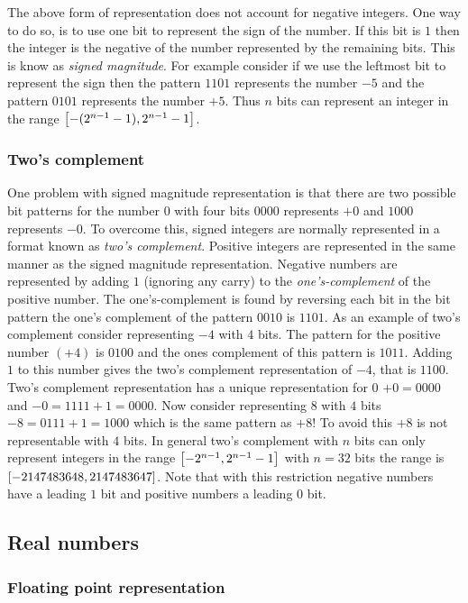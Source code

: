 The above form of representation does not account for negative integers.  One
way to do so, is to use one bit to represent the sign of the number. If this
bit is $1$ then the integer is the negative of the number represented by the
remaining bits. This is know as \emph{signed magnitude}.  For example consider
if we use the leftmost bit to represent the sign then the pattern $1101$
represents the number $-5$ and the pattern $0101$ represents the number $+5$.
Thus $n$ bits can represent an integer in the range
$\left[ -(2^{n-1}-1),2^{n-1}-1 \right]$.

\subsubsection{Two's complement}

One problem with signed magnitude representation is that there are two
possible bit patterns for the number $0$ \ie with four bits $0000$ represents
$+0$ and $1000$ represents $-0$. To overcome this, signed integers are
normally represented in a format known as \emph{two's complement}. Positive
integers are represented in the same manner as the signed magnitude
representation. Negative numbers are represented by adding $1$ (ignoring any
carry) to the \emph{one's-complement} of the positive number. The
one's-complement is found by reversing each bit in the bit pattern \eg the
one's complement of the pattern $0010$ is $1101$. As an example of two's
complement consider representing $-4$ with $4$ bits. The pattern for the
positive number $(+4)$ is $0100$ and the ones complement of this pattern is
$1011$.  Adding $1$ to this number gives the two's complement representation
of $-4$, that is $1100$.  Two's complement representation has a unique
representation for $0$ \ie $+0 = 0000$ and $-0 = 1111 + 1 = 0000$. Now
consider representing $8$ with $4$ bits \ie $-8 = 0111+1 = 1000$ which is the
same pattern as $+8$! To avoid this $+8$ is not representable with $4$ bits.
In general two's complement with $n$ bits can only represent integers in the
range $\left[ -2^{n-1},2^{n-1}-1 \right]$ \eg with $n=32$ bits the range is
$\left[ -2147483648, 2147483647 \right]$. Note that with this restriction negative
numbers have a leading $1$ bit and positive numbers a leading $0$ bit.

\subsection{Real numbers}

\subsubsection{Floating point representation}
\label{sec:CompAndNumericsFPRepresentation}

